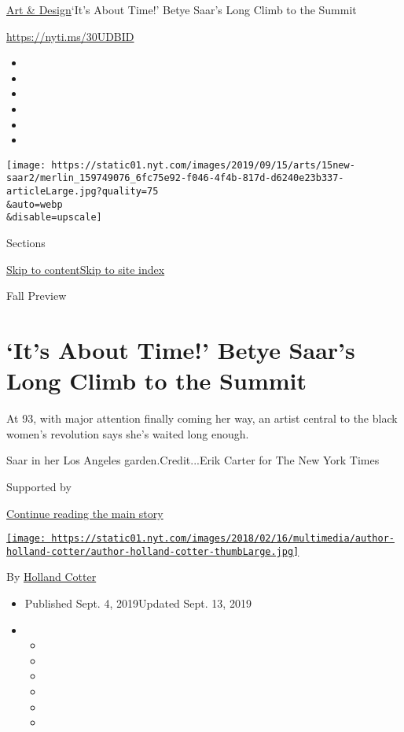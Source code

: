 \href{/section/arts/design}{Art \& Design}\textbar{}`It's About Time!'
Betye Saar's Long Climb to the Summit

\href{https://nyti.ms/30UDBID}{https://nyti.ms/30UDBID}

\begin{itemize}
\item
\item
\item
\item
\item
\item
\end{itemize}

\texttt{[image: https://static01.nyt.com/images/2019/09/15/arts/15new-saar2/merlin\_159749076\_6fc75e92-f046-4f4b-817d-d6240e23b337-articleLarge.jpg?quality=75\\\&auto=webp\\\&disable=upscale]}

Sections

\protect\hyperlink{site-content}{Skip to
content}\protect\hyperlink{site-index}{Skip to site index}

Fall Preview

\hypertarget{its-about-time-betye-saars-long-climb-to-the-summit}{%
\section{`It's About Time!' Betye Saar's Long Climb to the
Summit}\label{its-about-time-betye-saars-long-climb-to-the-summit}}

At 93, with major attention finally coming her way, an artist central to
the black women's revolution says she's waited long enough.

Saar in her Los Angeles garden.Credit...Erik Carter for The New York
Times

Supported by

\protect\hyperlink{after-sponsor}{Continue reading the main story}

\href{https://www.nytimes.com/by/holland-cotter}{\texttt{[image: https://static01.nyt.com/images/2018/02/16/multimedia/author-holland-cotter/author-holland-cotter-thumbLarge.jpg]}}

By \href{https://www.nytimes.com/by/holland-cotter}{Holland Cotter}

\begin{itemize}
\item
  Published Sept. 4, 2019Updated Sept. 13, 2019
\item
  \begin{itemize}
  \item
  \item
  \item
  \item
  \item
  \item
  \end{itemize}
\end{itemize}

